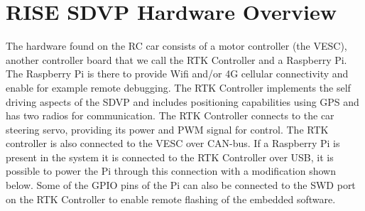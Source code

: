 \documentclass[12pt]{article} %
\begin{document}
\section{RISE SDVP Hardware Overview} 

The hardware found on the RC car consists of a motor controller (the
VESC), another controller board that we call the RTK Controller and a
Raspberry Pi.  The Raspberry Pi is there to provide Wifi and/or 4G
cellular connectivity and enable for example remote debugging. The RTK
Controller implements the self driving aspects of the SDVP and
includes positioning capabilities using GPS and has two radios for
communication. The RTK Controller connects to the car steering servo,
providing its power and PWM signal for control. The RTK controller is
also connected to the VESC over CAN-bus. If a Raspberry Pi is present
in the system it is connected to the RTK Controller over USB, it is
possible to power the Pi through this connection with a modification
shown below. Some of the GPIO pins of the Pi can also be connected to
the SWD port on the RTK Controller to enable remote flashing of the
embedded software.

\vspace{5mm}
\end{document}
